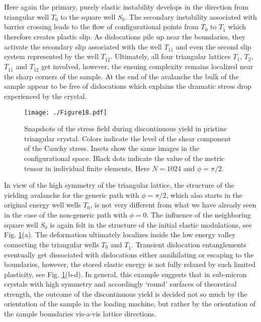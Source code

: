 \documentclass[CRPHYS,Unicode,manuscript]{cedram}
\begin{document}
Here again the primary, purely elastic  instability develops in the direction from triangular well $T_0$ to the square well $S_0$. The secondary instability associated with barrier crossing  leads to the flow of configurational points from  $T_0$ to  $T_{\bar 1}$ which  therefore  creates plastic slip. As dislocations pile up near the boundaries, they   activate the secondary  slip  associated with    the   well    $T_{\bar 1\bar 1}$ and  even the second slip system represented by the well $T_{\bar 1\bar 2}$.  Ultimately, all four triangular lattices $T_1$, $T_2$,  $T_{1\bar1}$ and $T_{\bar1\bar2}$ get involved, however, the ensuing complexity remains localized near the sharp corners of the sample. At the end of the avalanche the bulk of the sample appear to be free of dislocations which explains the dramatic stress drop experienced by the crystal.
\begin{figure}[h!]
\centering
\texttt{[image: ./Figure18.pdf]}
\caption{\scriptsize {Snapshots of the stress field during discontinuous yield in pristine triangular  crystal. Colors indicate the level of the shear component of the Cauchy   stress. Insets show the same images in the configurational space.  Black dots indicate the value of the metric tensor in individual finite elements. Here $N=1024$ and $\phi=\pi/2$.  }
 \label{fig:th90hex}}
\end{figure}
In view of the high symmetry of the triangular lattice, the structure of the yielding avalanche  for the   generic path with $ \phi =\pi/2$,   which also starts  in the   original  energy well wells $T_0$,  is not very different from what we have already seen in the case of the non-generic path with $ \phi=0$. 
The influence of the neighboring square well $S_0$ is again felt in the   structure of the initial elastic modulations, see Fig.  \ref{fig:th90hex}(a).  The deformation ultimately localizes inside the low energy valley connecting the triangular wells  $T_0$ and $T_{\bar 1}$.  Transient dislocation entanglements eventually get dissociated with dislocations either annihilating or escaping to the boundaries, however,  the stored elastic energy is not fully relaxed by such limited plasticity, see Fig.  \ref{fig:th90hex}(b-d). In general, this example suggests  that in sub-micron crystals with high  symmetry and accordingly `round'   surfaces of theoretical strength,  the outcome of the discontinuous yield is decided not so much  by   the orientation of the sample in the loading machine, but rather by the orientation of the sample boundaries vis-a-vis  lattice directions. 
\end{document}
